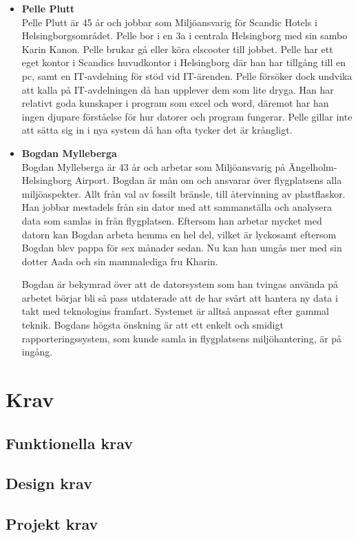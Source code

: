 \documentclass{article}
\begin{document}
\begin{itemize}
\begin{itemize}
            \item [] \textbf{Pelle Plutt}
            \\
            Pelle Plutt är 45 år och jobbar som Miljöansvarig för Scandic Hotels i Helsingborgsområdet. Pelle bor i en 3a i centrala Helsingborg med sin sambo Karin Kanon. Pelle brukar gå eller köra elscooter till jobbet. Pelle har ett eget kontor i Scandics huvudkontor i Helsingborg där han har tillgång till en pc, samt en IT-avdelning för stöd vid IT-ärenden. Pelle försöker dock undvika att kalla på IT-avdelningen då han upplever dem som lite dryga. Han har relativt goda kunskaper i program som excel och word, däremot har han ingen djupare förståelse för hur datorer och program fungerar. Pelle gillar inte att sätta sig in i nya system då han ofta tycker det är krångligt.
            
             \item [] \textbf{Bogdan Mylleberga}
            \\
            Bogdan Mylleberga är 43 år och arbetar som Miljöansvarig på Ängelholm-Helsingborg Airport. Bogdan är mån om och ansvarar över flygplatsens alla miljöaspekter. Allt från val av fossilt bränsle, till återvinning av plastflaskor. Han jobbar mestadels från sin dator med att sammanställa och analysera data som samlas in från flygplatsen. Eftersom han arbetar mycket med datorn kan Bogdan arbeta hemma en hel del, vilket är lyckosamt eftersom Bogdan blev pappa för sex månader sedan. Nu kan han umgås mer med sin dotter Aada och sin mammalediga fru Kharin.

            Bogdan är bekymrad över att de datorsystem som han tvingas använda på arbetet börjar bli så pass utdaterade att de har svårt att hantera ny data i takt med teknologins framfart. Systemet är alltså anpassat efter gammal teknik. Bogdans högsta önskning är att ett enkelt och smidigt rapporteringssystem, som kunde samla in flygplatsens miljöhantering, är på ingång.


            

            


            
        \end{itemize}
        
        
              
       
    \end{itemize}
        
    
    
    \newpage
    
\section{Krav}
    \subsection{Funktionella krav}
    
    \subsection{Design krav}
    
    \subsection{Projekt krav}
\end{document}
